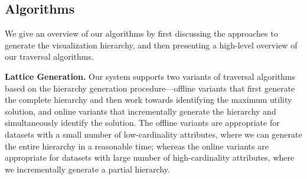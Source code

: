 
\subsection{Algorithms\label{algorithms}}
We give an overview of our algorithms by first discussing the approaches to generate the visualization hierarchy, and then presenting a high-level overview of our traversal algorithms.

\textbf{Lattice Generation.} Our system supports two variants of traversal algorithms based on the hierarchy generation procedure---offline variants that first generate the complete hierarchy and then work towards identifying the maximum utility solution, and online variants that incrementally generate the hierarchy and simultaneously identify the solution. The offline variants are appropriate for datasets with a small number of low-cardinality attributes, where we can generate the entire hierarchy in a reasonable time; whereas the online variants are appropriate for datasets with large number of high-cardinality attributes, where we incrementally generate a partial hierarchy. 

